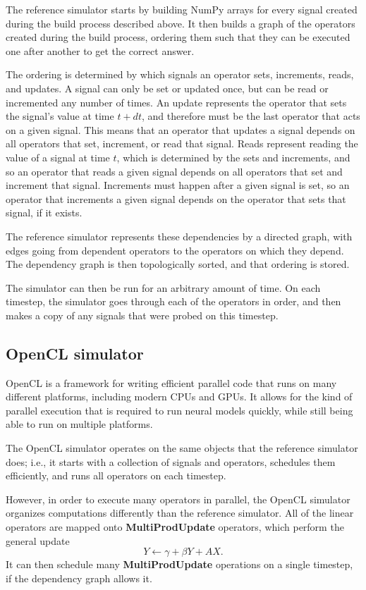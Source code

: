 \documentclass{frontiersSCNS}
\begin{document}
The reference simulator starts by
building NumPy arrays
for every signal created during the build process
described above.
It then builds a graph of the
operators created during the build process,
ordering them such that they can be
executed one after another to get the correct answer.

The ordering is determined
by which signals an operator
sets, increments, reads, and updates.
A signal can only be set or updated once,
but can be read or incremented any number of times.
An update represents the operator that sets
the signal's value at time $t+dt$,
and therefore must be the last operator
that acts on a given signal.
This means that an operator
that updates a signal depends on
all operators that set, increment,
or read that signal.
Reads represent reading the value
of a signal at time $t$,
which is determined by the sets
and increments, and so
an operator that reads a given signal
depends on all operators that
set and increment that signal.
Increments must happen
after a given signal is set,
so an operator that increments a given
signal depends on the operator
that sets that signal, if it exists.

The reference simulator represents
these dependencies by a directed graph,
with edges going from
dependent operators to
the operators on which they depend.
The dependency graph is then topologically sorted,
and that ordering is stored.

The simulator can then be run
for an arbitrary amount of time.
On each timestep,
the simulator goes through each of the
operators in order,
and then makes a copy of any signals
that were probed on this timestep.

\subsection{OpenCL simulator}

OpenCL is a framework for writing
efficient parallel code that runs
on many different platforms,
including modern CPUs and GPUs.
It allows for the kind of parallel execution
that is required to run neural models quickly,
while still being able to run
on multiple platforms.

The OpenCL simulator operates on
the same objects that the reference simulator does;
i.e., it starts with a collection
of signals and operators,
schedules them efficiently,
and runs all operators on each timestep.

However, in order to execute
many operators in parallel,
the OpenCL simulator
organizes computations
differently than the reference simulator.
All of the linear operators are mapped
onto \textbf{MultiProdUpdate} operators,
which perform the general update
$$Y \leftarrow \gamma + \beta Y + AX.$$
It can then schedule many
\textbf{MultiProdUpdate} operations
on a single timestep,
if the dependency graph allows it.
\end{document}
